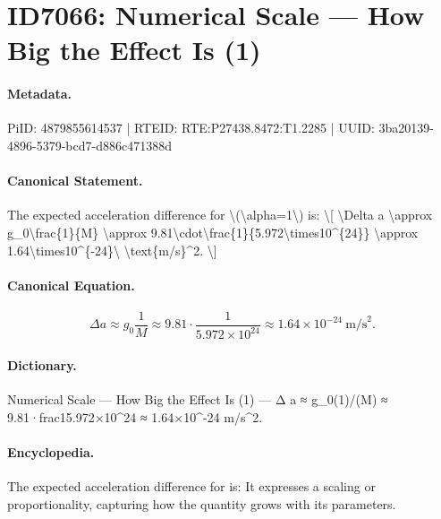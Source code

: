 \section*{ID7066: Numerical Scale — How Big the Effect Is (1)}
\paragraph{Metadata.}
PiID: 4879855614537 | RTEID: RTE:P27438.8472:T1.2285 | UUID: 3ba20139-4896-5379-bcd7-d886c471388d

\paragraph{Canonical Statement.}
The expected acceleration difference for \textbackslash{}(\textbackslash{}alpha=1\textbackslash{}) is: \textbackslash{}[ \textbackslash{}Delta a \textbackslash{}approx g\_0\textbackslash{}frac\{1\}\{M\} \textbackslash{}approx 9.81\textbackslash{}cdot\textbackslash{}frac\{1\}\{5.972\textbackslash{}times10\textasciicircum{}\{24\}\} \textbackslash{}approx 1.64\textbackslash{}times10\textasciicircum{}\{-24\}\textbackslash{} \textbackslash{}text\{m/s\}\textasciicircum{}2. \textbackslash{}]

\paragraph{Canonical Equation.}
\[
\Delta a \approx g_0\frac{1}{M} \approx 9.81\cdot\frac{1}{5.972\times10^{24}} \approx 1.64\times10^{-24}\ \text{m/s}^2.
\]

\paragraph{Dictionary.}
Numerical Scale — How Big the Effect Is (1) — Δ a ≈ g\_0(1)/(M) ≈ 9.81·frac15.972×10\textasciicircum{}24 ≈ 1.64×10\textasciicircum{}-24 m/s\textasciicircum{}2.

\paragraph{Encyclopedia.}
The expected acceleration difference for is: It expresses a scaling or proportionality, capturing how the quantity grows with its parameters.
